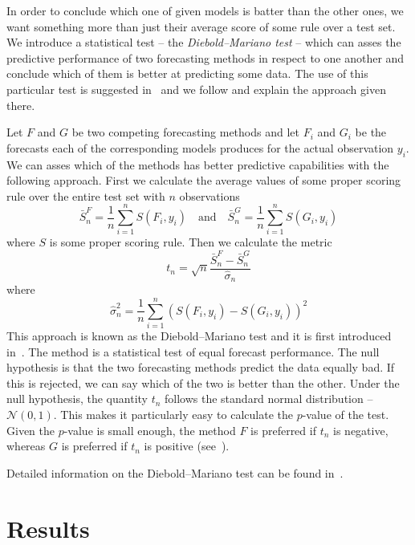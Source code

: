 \documentclass[12pt,a4paper,twoside]{scrartcl}
\numberwithin{equation}{section}
\begin{document}
In order to conclude which one of given models is batter than the other ones, we want something more than just their average score of some rule over a test set. We introduce a statistical test -- the \emph{Diebold–Mariano test} -- which can asses the predictive performance of two forecasting methods in respect to one another and conclude which of them is better at predicting some data. The use of this particular test is suggested in~\cite{gneiting2014} and we follow and explain the approach given there.

Let \(F\) and \(G\) be two competing forecasting methods and let \(F_i \) and \(G_i \) be the forecasts each of the corresponding models produces for the actual observation \(y_i \). We can asses which of the methods has better predictive capabilities with the following approach. First we calculate the average values of some proper scoring rule over the entire test set with \(n\) observations
\begin{equation}
  \bar{S}^F_n=\frac{1}{n}\sum_{i=1}^nS(F_i, y_i) \quad \text{and} \quad \bar{S}^G_n=\frac{1}{n}\sum_{i=1}^nS(G_i, y_i)
\end{equation}
where \(S \) is some proper scoring rule. Then we calculate the metric
\begin{equation}
  t_n=\sqrt{n}\frac{\bar{S}_n^F-\bar{S}_n^G}{\hat{\sigma}_n}
\end{equation}
where
\begin{equation}
  \hat{\sigma}_n^2=\frac{1}{n}\sum_{i=1}^n(S(F_i,y_i)-S(G_i,y_i))^2
\end{equation}
This approach is known as the Diebold–Mariano test and it is first introduced in~\cite{diebold95}. The method is a statistical test of equal forecast performance. The null hypothesis is that the two forecasting methods predict the data equally bad\textbackslash@good. If this is rejected, we can say which of the two is better than the other. Under the null hypothesis, the quantity \(t_n\) follows the standard normal distribution -- \(\mathcal{N}(0,1)\). This makes it particularly easy to calculate the \(p\)-value of the test. Given the \(p\)-value is small enough, the method \(F\) is preferred if \(t_n \) is negative, whereas \(G\) is preferred if \(t_n\) is positive (see~\cite{gneiting2014}).

\noindent Detailed information on the Diebold–Mariano test can be found in~\cite{diebold2015}.
\section{Results}\label{sec:res}
\end{document}
